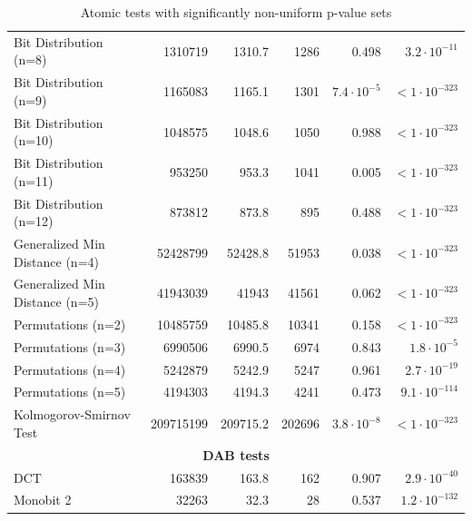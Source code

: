 \documentclass[
  digital,  	%
  color,		%
  oneside,   	%
  12pt,
  nocover,
  notable,
  nolof,
  nolot,
]{fithesis3}
\newcommand{\rd}{\cellcolor{red!40}}
\theoremstyle{definition}
\theoremstyle{remark}
\begin{document}
\begin{table}
\begin{nomar}
{\begin{tabular}{@{}lrrrrr@{}}
Bit Distribution (n=8)         & 1310719           & 1310.7        & 1286          & 0.498                  & $3.2 \cdot 10^{-11}$  \rd \\
Bit Distribution (n=9)         & 1165083           & 1165.1        & 1301          & $7.4\cdot 10^{-5}$ \rd & $<1\cdot 10^{-323}$   \rd \\
Bit Distribution (n=10)        & 1048575           & 1048.6        & 1050          & 0.988                  & $<1\cdot 10^{-323}$   \rd \\
Bit Distribution (n=11)        & 953250            & 953.3         & 1041          & 0.005                  & $<1\cdot 10^{-323}$   \rd \\
Bit Distribution (n=12)        & 873812            & 873.8         & 895           & 0.488                  & $<1\cdot 10^{-323}$   \rd \\
Generalized Min Distance (n=4) & 52428799          & 52428.8       & 51953         & 0.038                  & $<1\cdot 10^{-323}$   \rd \\
Generalized Min Distance (n=5) & 41943039          & 41943         & 41561         & 0.062                  & $<1\cdot 10^{-323}$   \rd \\
Permutations (n=2)             & 10485759          & 10485.8       & 10341         & 0.158                  & $<1\cdot 10^{-323}$   \rd \\
Permutations (n=3)             & 6990506           & 6990.5        & 6974          & 0.843                  & $1.8 \cdot 10^{-5}$   \rd \\
Permutations (n=4)             & 5242879           & 5242.9        & 5247          & 0.961                  & $2.7 \cdot 10^{-19}$  \rd \\
Permutations (n=5)             & 4194303           & 4194.3        & 4241          & 0.473                  & $9.1 \cdot 10^{-114}$ \rd \\
Kolmogorov-Smirnov Test        & 209715199         & 209715.2      & 202696        & $3.8\cdot 10^{-8}$ \rd & $<1\cdot 10^{-323}$   \rd \\ \midrule
\multicolumn{6}{c}{\textbf{DAB tests}} \\ \midrule
DCT                            & 163839            & 163.8         & 162           & 0.907                  & $2.9 \cdot 10^{-40}$  \rd \\
Monobit 2                      & 32263             & 32.3          & 28            & 0.537                  & $1.2 \cdot 10^{-132}$ \rd \\ \bottomrule
\end{tabular}
}
\end{nomar}
\caption{Atomic tests with significantly non-uniform p-value sets}
\label{tab:non_uniform_atomic_tests}
\end{table}
\end{document}
